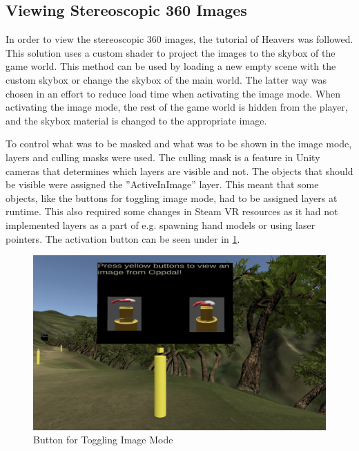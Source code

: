     
    \subsection{Viewing Stereoscopic 360 Images}
        In order to view the stereoscopic 360 images, the tutorial of Heavers\cite{skybox_images} was followed. This solution uses a custom shader to project the images to the skybox of the game world. This method can be used by loading a new empty scene with the custom skybox or change the skybox of the main world. The latter way was chosen in an effort to reduce load time when activating the image mode. When activating the image mode, the rest of the game world is hidden from the player, and the skybox material is changed to the appropriate image.
        
        To control what was to be masked and what was to be shown in the image mode, layers and culling masks were used. The culling mask is a feature in Unity cameras that determines which layers are visible and not. The objects that should be visible were assigned the ''ActiveInImage'' layer. This meant that some objects, like the buttons for toggling image mode, had to be assigned layers at runtime. This also required some changes in Steam VR resources as it had not implemented layers as a part of e.g. spawning hand models or using laser pointers. The activation button can be seen under in \cref{fig:image_viewer}.
        
        \FloatBarrier
        \begin{figure}
            \centering
            \includegraphics[width=\ImageWidth]{figures/image_viewer_3.PNG}
            \caption{Button for Toggling Image Mode}
            \label{fig:image_viewer}
        \end{figure}
        \FloatBarrier
        
